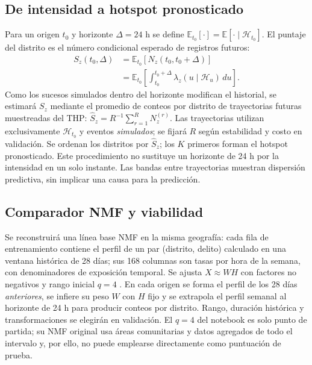 \documentclass[10pt,a4paper,twocolumn]{article}
\begin{document}
\subsection{De intensidad a hotspot pronosticado}
Para un origen $t_0$ y horizonte $\Delta=24$ h se define $\mathbb E_{t_0}[\cdot]=\mathbb E[\cdot\mid\mathcal H_{t_0}]$. El puntaje del distrito es el número condicional esperado de registros futuros:
\begin{equation}
\begin{split}
S_z(t_0,\Delta)&=\mathbb E_{t_0}[N_z(t_0,t_0+\Delta)]\\
&=\mathbb E_{t_0}\!\left[\int_{t_0}^{t_0+\Delta}\!\lambda_z(u\mid\mathcal H_u)\,du\right].
\end{split}
\label{eq:forecast}
\end{equation}
Como los sucesos simulados dentro del horizonte modifican el historial, se estimará $S_z$ mediante el promedio de conteos por distrito de trayectorias futuras muestreadas del THP: $\widehat S_z=R^{-1}\sum_{r=1}^{R}N_z^{(r)}$. Las trayectorias utilizan exclusivamente $\mathcal H_{t_0}$ y eventos \emph{simulados}; se fijará $R$ según estabilidad y costo en validación. Se ordenan los distritos por $\widehat S_z$; los $K$ primeros forman el hotspot pronosticado. Este procedimiento no sustituye un horizonte de 24 h por la intensidad en un solo instante. Las bandas entre trayectorias muestran dispersión predictiva, sin implicar una causa para la predicción.

\subsection{Comparador NMF y viabilidad}
Se reconstruirá una línea base NMF en la misma geografía: cada fila de entrenamiento contiene el perfil de un par (distrito, delito) calculado en una ventana histórica de 28 días; sus 168 columnas son tasas por hora de la semana, con denominadores de exposición temporal. Se ajusta $X\approx WH$ con factores no negativos y rango inicial $q=4$ \cite{lee1999nmf}. En cada origen se forma el perfil de los 28 días \emph{anteriores}, se infiere su peso $W$ con $H$ fijo y se extrapola el perfil semanal al horizonte de 24 h para producir conteos por distrito. Rango, duración histórica y transformaciones se elegirán en validación. El $q=4$ del notebook es solo punto de partida; su NMF original usa áreas comunitarias y datos agregados de todo el intervalo y, por ello, no puede emplearse directamente como puntuación de prueba.
\end{document}
